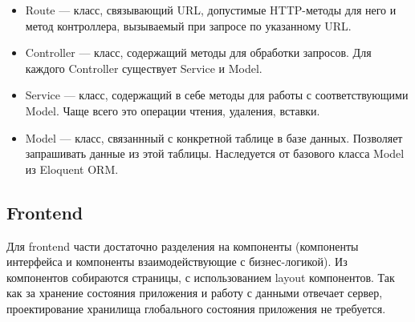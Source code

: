 \documentclass[../Отчет.tex]{subfiles}
\begin{document}
  \begin{itemize}
    \item Route — класс, связывающий URL, допустимые HTTP-методы для него и метод контроллера, вызываемый при запросе по указанному URL.
    \item Controller — класс, содержащий методы для обработки запросов. Для каждого Controller существует Service и Model.
    \item Service — класс, содержащий в себе методы для работы с соответствующими Model. Чаще всего это операции чтения, удаления, вставки.
    \item Model — класс, связаннный с конкретной таблице в базе данных. Позволяет запрашивать данные из этой таблицы. Наследуется от базового класса Model из Eloquent ORM.
  \end{itemize}
  \subsection{Frontend}
  \par 
  Для frontend части достаточно разделения на компоненты (компоненты интерфейса и компоненты взаимодействующие с бизнес-логикой). Из компонентов собираются страницы, с использованием layout компонентов.
  Так как за хранение состояния приложения и работу с данными отвечает сервер, проектирование хранилища глобального состояния приложения не требуется.
  \clearpage
\end{document}
